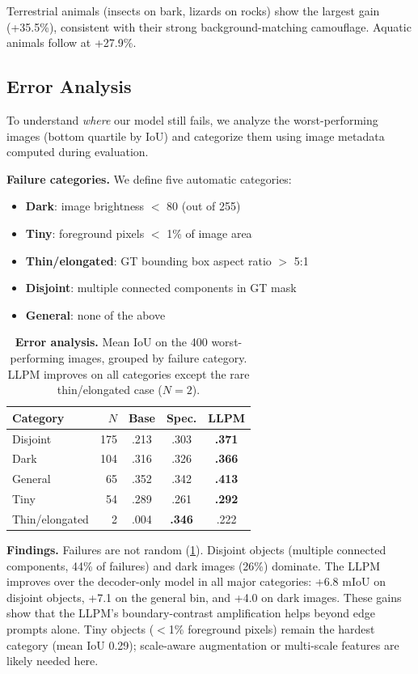 Terrestrial animals (insects on bark, lizards on rocks) show the largest gain (+35.5\%), consistent with their strong background-matching camouflage. Aquatic animals follow at +27.9\%.

\subsection{Error Analysis}
\label{sec:error_analysis}

To understand \emph{where} our model still fails, we analyze the worst-performing images (bottom quartile by IoU) and categorize them using image metadata computed during evaluation.

\noindent\textbf{Failure categories.} We define five automatic categories:
\begin{itemize}
    \item \textbf{Dark}: image brightness $<$ 80 (out of 255)
    \item \textbf{Tiny}: foreground pixels $<$ 1\% of image area
    \item \textbf{Thin/elongated}: GT bounding box aspect ratio $>$ 5:1
    \item \textbf{Disjoint}: multiple connected components in GT mask
    \item \textbf{General}: none of the above
\end{itemize}

\begin{table}[t]
\centering
\caption{\textbf{Error analysis.} Mean IoU on the 400 worst-performing images, grouped by failure category. LLPM improves on all categories except the rare thin/elongated case ($N\!=\!2$).}
\label{tab:error_analysis}
\small
\begin{tabular}{lrccc}
\toprule
Category & $N$ & Base & Spec. & LLPM \\
\midrule
Disjoint & 175 & .213 & .303 & \textbf{.371} \\
Dark & 104 & .316 & .326 & \textbf{.366} \\
General & 65 & .352 & .342 & \textbf{.413} \\
Tiny & 54 & .289 & .261 & \textbf{.292} \\
Thin/elongated & 2 & .004 & \textbf{.346} & .222 \\
\bottomrule
\end{tabular}
\end{table}

\noindent\textbf{Findings.}
Failures are not random (\cref{tab:error_analysis}). Disjoint objects (multiple connected components, 44\% of failures) and dark images (26\%) dominate. The LLPM improves over the decoder-only model in all major categories: +6.8 mIoU on disjoint objects, +7.1 on the general bin, and +4.0 on dark images. These gains show that the LLPM's boundary-contrast amplification helps beyond edge prompts alone. Tiny objects ($<$1\% foreground pixels) remain the hardest category (mean IoU 0.29); scale-aware augmentation or multi-scale features are likely needed here.

